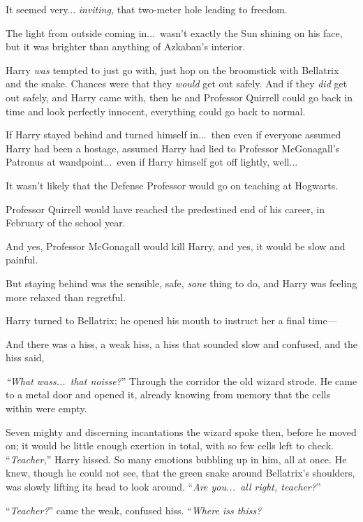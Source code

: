 It seemed very... \emph{inviting,} that two-meter hole leading to freedom.

The light from outside coming in...\ wasn’t exactly the Sun shining on his face, but it was brighter than anything of Azkaban’s interior.

Harry \emph{was} tempted to just go with, just hop on the broomstick with Bellatrix and the snake. Chances were that they \emph{would} get out safely. And if they \emph{did} get out safely, and Harry came with, then he and Professor Quirrell could go back in time and look perfectly innocent, everything could go back to normal.

If Harry stayed behind and turned himself in...\ then even if everyone assumed Harry had been a hostage, assumed Harry had lied to Professor McGonagall’s Patronus at wandpoint...\ even if Harry himself got off lightly, well...

It wasn’t likely that the Defense Professor would go on teaching at Hogwarts.

Professor Quirrell would have reached the predestined end of his career, in February of the school year.

And yes, Professor McGonagall would kill Harry, and yes, it would be slow and painful.

But staying behind was the sensible, safe, \emph{sane} thing to do, and Harry was feeling more relaxed than regretful.

Harry turned to Bellatrix; he opened his mouth to instruct her a final time—

And there was a hiss, a weak hiss, a hiss that sounded slow and confused, and the hiss said,

\emph{“What wass...\ that noisse?}”
\sbreak
Through the corridor the old wizard strode. He came to a metal door and opened it, already knowing from memory that the cells within were empty.

Seven mighty and discerning incantations the wizard spoke then, before he moved on; it would be little enough exertion in total, with so few cells left to check.
\sbreak
“\emph{Teacher,}” Harry hissed. So many emotions bubbling up in him, all at once. He knew, though he could not see, that the green snake around Bellatrix’s shoulders, was slowly lifting its head to look around. “\emph{Are you...\ all right, teacher?}”

“\emph{Teacher?}” came the weak, confused hiss. “\emph{Where iss thiss?}

